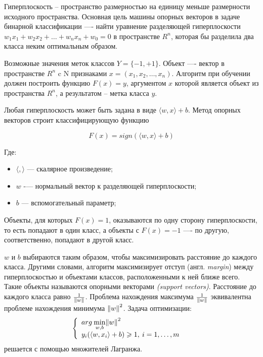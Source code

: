 Гиперплоскость -- пространство размерностью на единицу меньше размерности исходного пространства.
Основная цель машины опорных векторов в задаче бинарной классификации —- найти 
уравнение разделяющей гиперплоскости $w_1x_1+w_2x_2+…+w_nx_n+w_0=0$ 
в пространстве $R^n$, которая бы разделила два класса неким оптимальным образом. 

Возможные значения меток классов $Y = \{-1, +1\}$. Объект —- вектор в пространстве $R^n$ c 
N признаками $x = (x_1, x_2, \dots, x_n)$. Алгоритм при обучении должен построить функцию 
$F(x)=y$, аргументом $x$ которой является объект из пространства $R^n$, а результатом -- метка класса $y$.

Любая гиперплоскость может быть задана в виде $\langle w, x \rangle + b$.
Метод опорных векторов строит классифицирующую функцию

    \[F(x) = sign(\langle w, x \rangle + b)\]

Где: 
\begin{itemize}
    \item[\bullet] $\langle , \rangle$ — скалярное произведение;
    \item[\bullet] $w$ -— нормальный вектор к разделяющей гиперплоскости;
    \item[\bullet] $b$ — вспомогательный параметр;
\end{itemize}

Объекты, для которых $F(x) = 1$, оказываются по одну сторону гиперплоскости, 
то есть попадают в один класс, а объекты с $F(x) = -1$ —- по другую, соответственно, 
попадают в другой класс.

$w$ и $b$ выбираются таким образом, чтобы максимизировать расстояние до каждого класса. 
Другими словами, алгоритм максимизирует отступ (англ. \emph{margin}) между гиперплоскостью 
и объектами классов, расположенными к ней ближе всего. Такие объекты называются опорными векторами \emph{(support vectors)}.
Расстояние до каждого класса равно $\frac {1}{\Arrowvert w \Arrowvert}$. Проблема нахождения максимума 
$\frac {1}{\Arrowvert w \Arrowvert}$ эквивалентна проблеме нахождения минимума ${\Arrowvert w \Arrowvert}^2$. 
Задача оптимизации:
\begin{equation}\label{eq6}
    \left\{ \begin{array}{ll} arg \: \underset{w,b}{\min} {\Arrowvert w \Arrowvert}^2 & \textrm{}\\ y_i(\langle w,x_i \rangle + b) \geqslant 1, \: i = 1, \dots, m \end{array} \right.
\end{equation}
решается с помощью множителей Лагранжа.

